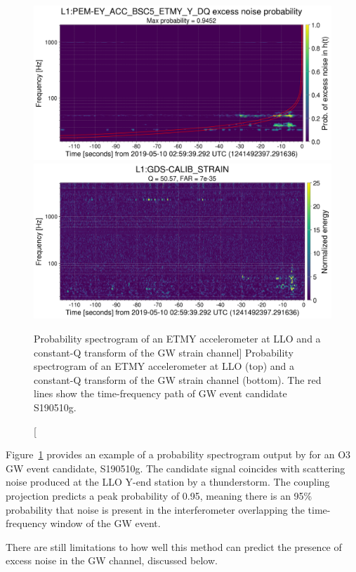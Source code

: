 \begin{figure}
	\includegraphics[width=\textwidth]{figures/noise-studies/vetting-spectrogram1.png}
	\includegraphics[width=\textwidth]{figures/noise-studies/vetting-spectrogram2.png}
	\caption
	[Probability spectrogram of an ETMY accelerometer at LLO and a constant-Q transform of the GW strain channel]
	{
		Probability spectrogram of an ETMY accelerometer at LLO (top) and a constant-Q transform of the GW strain channel (bottom).
		The red lines show the time-frequency path of GW event candidate S190510g.}
	\label{fig:vetting-spectrograms}
\end{figure}

Figure~\ref{fig:vetting-spectrograms} provides an example of a probability spectrogram output by  for an \ac{O3} \ac{GW} event candidate, S190510g.
The candidate signal coincides with scattering noise produced at the \ac{LLO} Y-end station by a thunderstorm.
The coupling projection predicts a peak probability of 0.95, meaning there is an 95\% probability that noise is present in the interferometer overlapping the time-frequency window of the \ac{GW} event.

There are still limitations to how well this method can predict the presence of excess noise in the \ac{GW} channel, discussed below.

